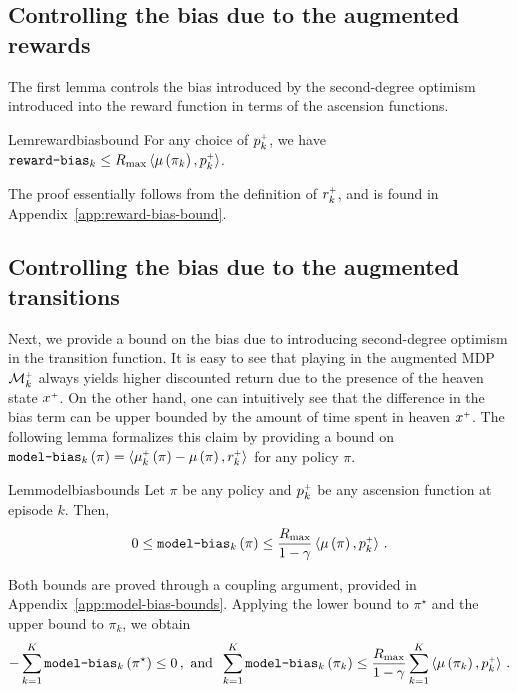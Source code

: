 \subsection{Controlling the bias due to the augmented rewards}

The first lemma controls the bias introduced by the second-degree optimism introduced into the reward function in terms of the ascension functions.
%
\begin{restatable}{Lem}{rewardbiasbound} \label{lem:reward-bias-bound}
    For any choice of $p_k^{\mathsf{\scriptscriptstyle +}}$, we have $\texttt{reward-bias}_k \leq R_{\max} \left\langle \mu \left( \pi_k \right), p_k^{\mathsf{\scriptscriptstyle +}} \right\rangle$.
\end{restatable}
%
The proof essentially follows from the definition of $r_k^{\mathsf{\scriptscriptstyle +}}$, and is found in Appendix~\ref{app:reward-bias-bound}.


\subsection{Controlling the bias due to the augmented transitions}

Next, we provide a bound on the bias due to introducing second-degree optimism in the transition function. It is easy to see that playing in the augmented MDP $\mathcal{M}_k^{\mathsf{\scriptscriptstyle +}}$ always yields higher discounted return due to the presence of the heaven state $x^{\mathsf{\scriptscriptstyle +}}$. On the other hand, one can intuitively see that the difference in the bias term can be upper bounded by the amount of time spent in heaven $x^{\mathsf{\scriptscriptstyle +}}$. The following lemma formalizes this claim by providing a bound on $\texttt{model-bias}_k \left( \pi \right) = \left\langle \mu_k^{\mathsf{\scriptscriptstyle +}} \left( \pi \right) - \mu \left( \pi \right), r_k^{\mathsf{\scriptscriptstyle +}} \right\rangle$ for any policy $\pi$.
%
\begin{restatable}{Lem}{modelbiasbounds} \label{lem:model-bias-bounds}
    Let $\pi$ be any policy and $p_k^{\mathsf{\scriptscriptstyle +}}$ be any ascension function at episode $k$. Then,
    \begin{equation*}
        0 \leq \texttt{model-bias}_k \left( \pi \right) \leq \frac{R_{\max}}{1 - \gamma} \left\langle \mu \left( \pi \right), p_k^{\mathsf{\scriptscriptstyle +}} \right\rangle\,.
    \end{equation*}
\end{restatable}
%
Both bounds are proved through a coupling argument, provided in Appendix~\ref{app:model-bias-bounds}. Applying the lower bound to $\pi^\star$ and the upper bound to $\pi_k$, we obtain
%
\begin{equation} \label{eq:model-bias-bounds}
    - \sum_{k=1}^K \texttt{model-bias}_k \left( \pi^\star \right) \leq 0\,, \text{ and}\;\; \sum_{k=1}^K \texttt{model-bias}_k \left( \pi_k \right) \leq \frac{R_{\max}}{1 - \gamma} \sum_{k=1}^K \left\langle \mu \left( \pi_k \right), p_k^{\mathsf{\scriptscriptstyle +}} \right\rangle\,.
\end{equation}


